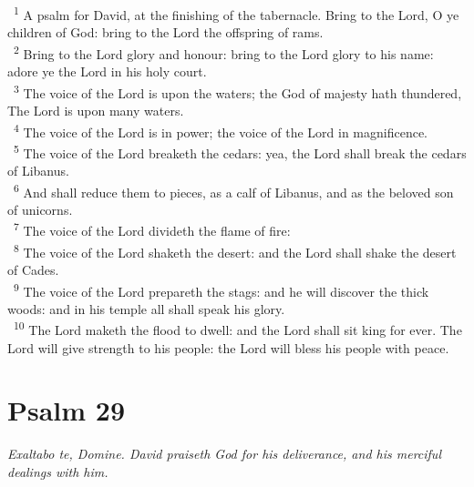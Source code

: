 \documentclass[a5paper,12pt]{article}
\begin{document}
\begin{multicols*}{2}
~\textsuperscript{1} A psalm for David, at the finishing of the tabernacle. Bring to the Lord, O ye children of God: bring to the Lord the offspring of rams.\\
~\textsuperscript{2} Bring to the Lord glory and honour: bring to the Lord glory to his name: adore ye the Lord in his holy court.\\
~\textsuperscript{3} The voice of the Lord is upon the waters; the God of majesty hath thundered, The Lord is upon many waters.\\
~\textsuperscript{4} The voice of the Lord is in power; the voice of the Lord in magnificence.\\
~\textsuperscript{5} The voice of the Lord breaketh the cedars: yea, the Lord shall break the cedars of Libanus.\\
~\textsuperscript{6} And shall reduce them to pieces, as a calf of Libanus, and as the beloved son of unicorns.\\
~\textsuperscript{7} The voice of the Lord divideth the flame of fire:\\
~\textsuperscript{8} The voice of the Lord shaketh the desert: and the Lord shall shake the desert of Cades.\\
~\textsuperscript{9} The voice of the Lord prepareth the stags: and he will discover the thick woods: and in his temple all shall speak his glory.\\
~\textsuperscript{10} The Lord maketh the flood to dwell: and the Lord shall sit king for ever. The Lord will give strength to his people: the Lord will bless his people with peace.\\

\section{Psalm 29}
\label{sec:orgd1d7bc8}
\emph{Exaltabo te, Domine. David praiseth God for his deliverance, and his merciful dealings with him.}\\


\end{multicols*}
\end{document}
